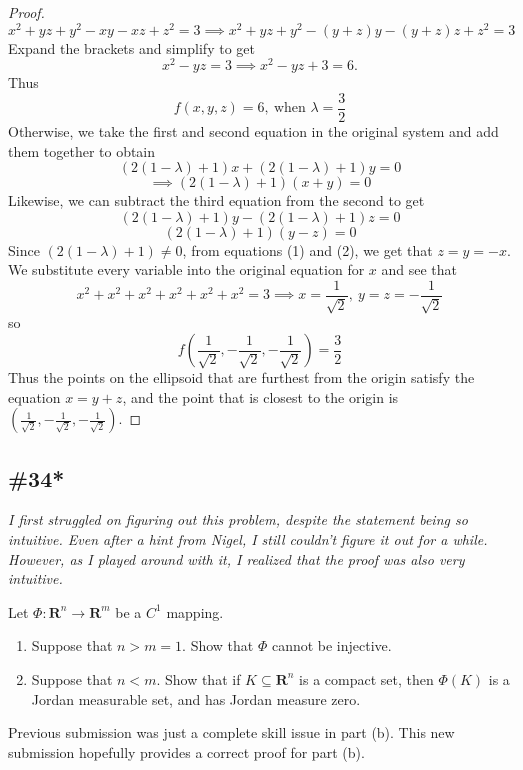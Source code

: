 \documentclass{article}
\newcommand{\R}{\mathbf{R}}
\theoremstyle{plain} %
\numberwithin{thm}{section} %
\theoremstyle{definition}
\begin{document}
\begin{proof}
        \[
            x^2 + yz + y^2 - xy - xz + z^2 = 3 \implies x^2 + yz + y^2 - (y + z)y - (y + z)z + z^2 = 3
        \]
        Expand the brackets and simplify to get
        \[
            x^2 - yz = 3 \implies x^2 - yz + 3 = 6.
        \]
        Thus
        \[
            f(x,y,z) = 6,\ \text{when } \lambda = \frac{3}{2}
        \]
        Otherwise, we take the first and second equation in the original system and add them together to obtain
        \[
            (2(1 - \lambda) + 1)x + (2(1 - \lambda) + 1)y = 0
        \]
        \[
            \implies (2(1 - \lambda) + 1)(x + y) = 0 \tag{1}
        \]
        Likewise, we can subtract the third equation from the second to get
        \[
            (2(1 - \lambda) + 1)y - (2(1 - \lambda) + 1)z = 0
        \]
        \[
            (2(1 - \lambda) + 1)(y - z) = 0 \tag{2}
        \]
        Since \((2(1 - \lambda) + 1) \neq 0\), from equations (1) and (2), we get that \(z = y = -x\). We substitute every variable into the original equation for \(x\) and see that
        \[
            x^2 + x^2 + x^2 + x^2 + x^2 + x^2 = 3 \implies x = \frac{1}{\sqrt{2}},\ y = z = -\frac{1}{\sqrt{2}}
        \]
        so
        \[
            f \left( \frac{1}{\sqrt{2}}, -\frac{1}{\sqrt{2}}, -\frac{1}{\sqrt{2}} \right) = \frac{3}{2}
        \]
        Thus the points on the ellipsoid that are furthest from the origin satisfy the equation \(x = y + z\), and the point that is closest to the origin is \(\left( \frac{1}{\sqrt{2}}, -\frac{1}{\sqrt{2}}, -\frac{1}{\sqrt{2}} \right)\).
        \end{proof}
        \newpage
        \subsection{\#34*}
        \textit{I first struggled on figuring out this problem, despite the statement being so intuitive. Even after a hint from Nigel, I still couldn't figure it out for a while. However, as I played around with it, I realized that the proof was also very intuitive.}

        Let $\Phi:\R^n\rightarrow\R^m$ be a $C^1$ mapping.
        \begin{enumerate}[label=(\alph*)]
            \item Suppose that $n>m = 1$. Show that $\Phi$ cannot be injective.
            
            \item Suppose that $n<m$. Show that if $K\subseteq\R^n$ is a compact set, then $\Phi(K)$ is a Jordan measurable set, and has Jordan measure zero.
        \end{enumerate}
        \color{red}
        Previous submission was just a complete skill issue in part (b). This new submission hopefully provides a correct proof for part (b).
\end{document}
